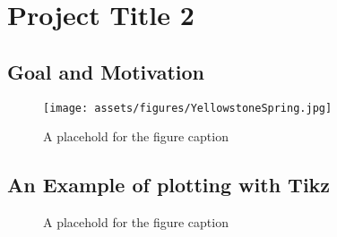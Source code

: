 \section{\textbf{Project Title 2}}

\subsection{Goal and Motivation}
\lipsum[21]

\begin{figure}[H]
    \centering
    \texttt{[image: assets/figures/YellowstoneSpring.jpg]}
    \caption{A placehold for the figure caption}
    \label{fig:label2}
\end{figure}


\subsection{An Example of plotting with Tikz}
\lipsum[28]

\begin{figure}[H]
\centering
{}
\caption{A placehold for the figure caption}
\end{figure}

\lipsum[25]

\newpage